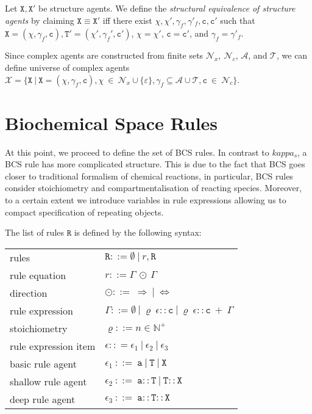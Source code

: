 \documentclass{entcs}
\renewcommand{\~}[0]{\texttildelow}
\newcommand{\choice}{|}
\begin{document}
\begin{defn}
Let $\mathtt{X},\mathtt{X}'$ be structure agents. We define the \emph{structural equivalence of structure agents} by claiming $\mathtt{X} \equiv \mathtt{X}'$ iff there exist $\chi,\chi',\gamma_f,\gamma'_f, \mathtt{c},\mathtt{c}'$ such that $\mathtt{X}=(\chi, \gamma_f, \mathtt{c}),\mathtt{T}'=(\chi', \gamma_f', \mathtt{c}')$, $\chi=\chi'$, $\mathtt{c} = \mathtt{c}'$, and $\gamma_f=\gamma'_f$.
\end{defn}

\begin{theorem}
Since complex agents are constructed from finite sets $\mathcal{N}_{x},~\mathcal{N}_{c}$, $\mathcal{A}$, and $\mathcal{T}$, we can define universe of complex agents $\mathcal{X} = \{ \mathtt{X}~|~\mathtt{X} = (\chi, \gamma_f, \mathtt{c}), \chi~\in~\mathcal{N}_{x} \cup \{\varepsilon\}, \gamma_f \subseteq \mathcal{A} \cup \mathcal{T},  \mathtt{c}~\in~\mathcal{N}_{c} \}$.
\end{theorem}

\section{Biochemical Space Rules}

At this point, we proceed to define the set of BCS rules. In contrast to $kappa_s$, a BCS rule has more complicated structure. This is due to the fact that BCS goes closer to traditional formalism of chemical reactions, in particular, BCS rules consider stoichiometry and compartmentalisation of reacting species. Moreover, to a certain extent we introduce variables in rule expressions allowing us to compact specification of repeating objects.  

The list of rules $\mathtt{R}$ is defined by the following syntax:

\begin{center}
{\small
\hspace*{-1cm}\begin{tabular}{ ll ll }
 rules& $\mathtt{R} ::= \emptyset ~|~ r, \mathtt{R} $\\
 rule equation & $r ::= \Gamma ~\odot~\Gamma$\\
 direction & $\odot ::=~ \Rightarrow~\choice~\Leftrightarrow $\\
 rule expression & \multicolumn{3}{l}{$\Gamma ::= \emptyset~\choice~\varrho~\epsilon::\mathtt{c}~\choice~ \varrho~\epsilon::\mathtt{c}~ +~\Gamma$}\\
 stoichiometry & \multicolumn{3}{l}{$\varrho ::= n \in \mathbb{N}^+$}\\
 rule expression item & \multicolumn{3}{l}{$\epsilon :: = \epsilon_1~\choice~\epsilon_2~\choice~\epsilon_3$}\\
 basic rule agent & \multicolumn{3}{l}{$\epsilon_1  ~::=~  \mathtt{a}~\choice~\mathtt{T}~\choice~\mathtt{X}$}\\
 shallow rule agent & \multicolumn{3}{l}{$\epsilon_2  ~::=~  \mathtt{a}::\mathtt{T}~\choice~\mathtt{T}::\mathtt{X}$}\\
 deep rule agent & \multicolumn{3}{l}{$\epsilon_3  ~::=~  \mathtt{a}::\mathtt{T}::\mathtt{X}$}
\end{tabular}
}
\end{center}
\end{document}
